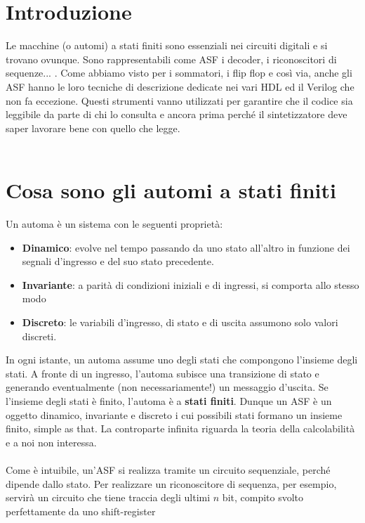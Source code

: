 \documentclass{book}
\begin{document}
    \section{Introduzione}
        Le macchine (o automi) a stati finiti sono essenziali nei circuiti digitali e si trovano ovunque. Sono rappresentabili 
        come ASF i decoder, i riconoscitori di sequenze... . Come abbiamo visto per i sommatori, i flip flop e così via, anche gli ASF 
        hanno le loro tecniche di descrizione dedicate nei vari HDL ed il Verilog che non fa eccezione. Questi strumenti vanno 
        utilizzati per garantire che il codice sia leggibile da parte di chi lo consulta e ancora prima perché il sintetizzatore deve saper
        lavorare bene con quello che legge. \\ \\
    \section{Cosa sono gli automi a stati finiti}
        Un automa è un sistema con le seguenti proprietà:
        \begin{itemize}
            \item \textbf{Dinamico}: evolve nel tempo passando da uno stato all'altro in funzione dei segnali d'ingresso
            e del suo stato precedente.
            \item \textbf{Invariante}: a parità di condizioni iniziali e di ingressi, si comporta allo stesso modo
            \item \textbf{Discreto}: le variabili d'ingresso, di stato e di uscita assumono solo valori discreti.
        \end{itemize}
        In ogni istante, un automa assume uno degli stati che compongono l'insieme degli stati. A fronte di un ingresso,
        l'automa subisce una transizione di stato e generando eventualmente (non necessariamente!)
        un messaggio d'uscita. Se l'insieme degli stati è finito, l'automa è a \textbf{stati finiti}. Dunque un ASF
        è un oggetto dinamico, invariante e discreto i cui possibili stati formano un insieme finito, simple as that. La controparte
        infinita riguarda la teoria della calcolabilità e a noi non interessa. \\ \\
        Come è intuibile, un'ASF si realizza tramite un circuito sequenziale, perché dipende dallo stato. Per realizzare un riconoscitore 
        di sequenza, per esempio, servirà un circuito che tiene traccia degli ultimi $n$ bit, compito svolto perfettamente da uno shift-register 
\end{document}
